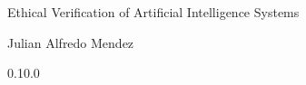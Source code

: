 \documentclass[12pt,a4paper]{book}
\begin{document}
    \begin{center}

        \phantom{H}

        \vspace{80mm}

        {\huge{Ethical Verification of Artificial Intelligence Systems}}

        \vspace{80mm}
        Julian Alfredo Mendez

        \vspace{10mm}
        0.10.0

    \end{center}

    \newpage

    
    
    
    

    
    

    
    
    
    
    

    
    
\end{document}
